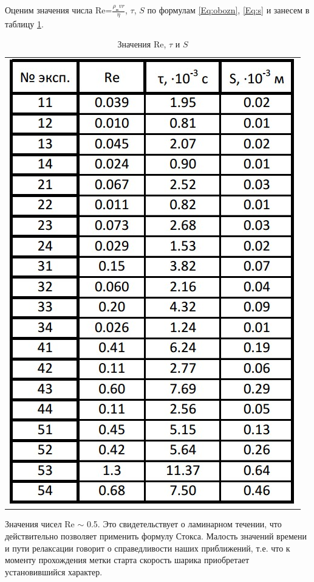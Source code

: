 \documentclass[a4paper,12pt]{article}
\begin{document}
Оценим значения числа Re=$\frac{\rho_{\text{ж}} v r}{\eta}$, $\tau$, $S$ по формулам \eqref{Eq:obozn}, \eqref{Eq:s} и занесем в таблицу \ref{Tab:Re}.
\begin{table} %
	\centering
	\begin{tabular}{c}
		\includegraphics[height=0.4\textheight]{exp_re}\\
	\end{tabular}
	\caption{Значения Re, $\tau$ и $S$}
	\label{Tab:Re}
\end{table}

Значения чисел Re $\sim$ 0.5. Это свидетельствует о ламинарном течении, что действительно позволяет применить формулу Стокса. Малость значений времени и пути релаксации говорит о справедливости наших приближений, т.е. что к моменту прохождения метки старта скорость шарика приобретает установившийся характер.
\end{document}
